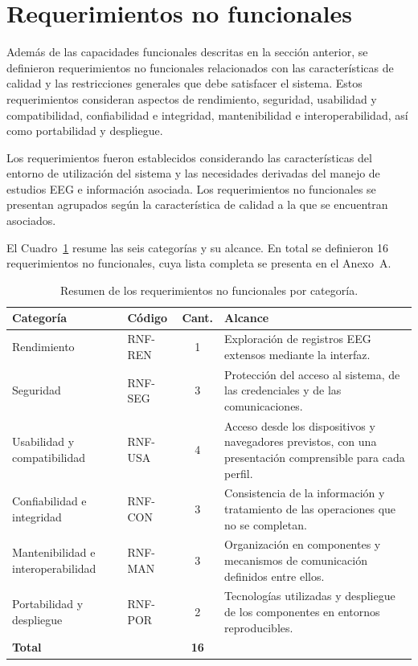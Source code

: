 \section{Requerimientos no funcionales}
\label{sec:requerimientos-no-funcionales}

Además de las capacidades funcionales descritas en la sección anterior, se
definieron requerimientos no funcionales relacionados con las características
de calidad y las restricciones generales que debe satisfacer el sistema. Estos
requerimientos consideran aspectos de rendimiento, seguridad, usabilidad y
compatibilidad, confiabilidad e integridad, mantenibilidad e interoperabilidad,
así como portabilidad y despliegue.

Los requerimientos fueron establecidos considerando las características del
entorno de utilización del sistema y las necesidades derivadas del manejo de
estudios EEG e información asociada. Los requerimientos no funcionales se presentan
agrupados según la característica de calidad a la que se encuentran asociados.

\begin{nuevotexto}
El Cuadro~\ref{tab:resumen-rnf} resume las seis categorías y su alcance.
En total se definieron 16 requerimientos no funcionales, cuya lista completa se presenta en el Anexo~A.

\begin{table}[H]
\centering
\marcanuevo
\caption{Resumen de los requerimientos no funcionales por categoría.}
\label{tab:resumen-rnf}
\small
\renewcommand{\arraystretch}{1.2}
\begin{tabular}{|p{3.6cm}|p{1.6cm}|c|p{7.2cm}|}
\hline
\textbf{Categoría} & \textbf{Código} & \textbf{Cant.} & \textbf{Alcance} \\
\hline
Rendimiento & RNF-REN & 1 & Exploración de registros EEG extensos mediante la interfaz. \\
\hline
Seguridad & RNF-SEG & 3 & Protección del acceso al sistema, de las credenciales y de las comunicaciones. \\
\hline
Usabilidad y compatibilidad & RNF-USA & 4 & Acceso desde los dispositivos y navegadores previstos, con una presentación comprensible para cada perfil. \\
\hline
Confiabilidad e integridad & RNF-CON & 3 & Consistencia de la información y tratamiento de las operaciones que no se completan. \\
\hline
Mantenibilidad e interoperabilidad & RNF-MAN & 3 & Organización en componentes y mecanismos de comunicación definidos entre ellos. \\
\hline
Portabilidad y despliegue & RNF-POR & 2 & Tecnologías utilizadas y despliegue de los componentes en entornos reproducibles. \\
\hline
\textbf{Total} & & \textbf{16} & \\
\hline
\end{tabular}
\end{table}
\end{nuevotexto}

